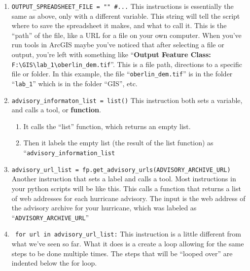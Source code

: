 \documentclass{article}
\begin{document}
\begin{enumerate}
    \item \verb+OUTPUT_SPREADSHEET_FILE = "" #...+ This instructions is essentially the same as above, only with a different variable.  This string will tell the script where to save the spreadsheet it makes, and what to call it.  This is the ``path'' of the file, like a URL for a file on your own computer.  When you've run tools in ArcGIS maybe you've noticed that after selecting a file or output, you're left with something like ``\textbf{Output Feature Class:} \verb+F:\GIS\lab_1\oberlin_dem.tif+''.  This is a file path, directions to a specific file or folder.  In this example, the file ``\verb+oberlin_dem.tif+'' is in the folder ``\verb+lab_1+'' which is in the folder ``GIS'', etc.  
    \item \verb+advisory_informaton_list = list()+ This instruction both sets a variable, and calls a tool, or \textbf{function}.
    \begin{enumerate}
        \item It calls the ``list'' function, which returns an empty list. 
        \item Then it labels the empty list (the result of the list function) as ``\verb+advisory_information_list+
    \end{enumerate}
    \item \verb+advisory_url_list = fp.get_advisory_urls(ADVISORY_ARCHIVE_URL)+  Another instruction that sets a label and calls a tool.  Most instructions in your python scripts will be like this.  This calls a function that returns a list of web addresses for each hurricane advisory.  The input is the web address of the advisory archive for your hurricane, which was labeled as ``\verb+ADVISORY_ARCHIVE_URL+''
    \item \verb+ for url in advisory_url_list:+  This instruction is a little different from what we've seen so far.  What it does is a create a loop allowing for the same steps to be done multiple times.  The steps that will be ``looped over'' are indented below the for loop.


\end{enumerate}
\end{document}
